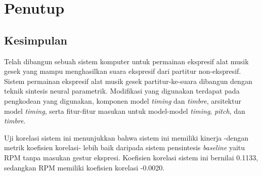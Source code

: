 \chapter{Penutup}

\section{Kesimpulan}




Telah dibangun sebuah sistem komputer untuk permainan ekspresif alat musik gesek yang mampu menghasilkan suara ekspresif dari partitur non-ekspresif. Sistem permainan ekspresif alat musik gesek partitur-ke-suara dibangun dengan teknik sintesis neural parametrik. Modifikasi yang digunakan terdapat pada pengkodean yang digunakan, komponen model \textit{timing} dan \textit{timbre}, arsitektur model \textit{timing}, serta fitur-fitur masukan untuk model-model \textit{timing}, \textit{pitch}, dan \textit{timbre}.

Uji korelasi sistem ini menunjukkan bahwa sistem ini memiliki kinerja -dengan metrik koefisien korelasi- lebih baik daripada sistem pensintesis \textit{baseline} yaitu RPM tanpa masukan gestur ekspresi. Koefisien korelasi sistem ini bernilai 0.1133, sedangkan RPM memiliki koefisien korelasi -0.0020.

